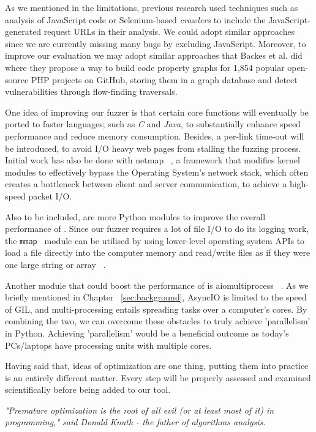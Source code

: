 As we mentioned in the limitations, previous research used techniques such as analysis of JavaScript code or Selenium-based \emph{crawlers} to include the JavaScript-generated request URLs in their analysis. We could adopt similar approaches since we are currently missing many bugs by excluding JavaScript. Moreover, to improve our evaluation we may adopt similar approaches that Backes et al. did  ~\cite{efficient2017} where they propose a way to build code property graphs for 1,854 popular open-source PHP projects on GitHub, storing them in a graph database and detect vulnerabilities through flow-finding traversals.

One idea of improving our fuzzer is that certain core functions will eventually be ported to faster languages; such as \emph{C} and \emph{Java}, to substantially enhance speed performance and reduce memory consumption. Besides, a per-link time-out will be introduced, to avoid I/O heavy web pages from stalling the fuzzing process. Initial work has also be done with netmap  ~\cite{rizzo2011Netmap}, a framework that modifies kernel modules to effectively bypass the Operating System's network stack, which often creates a bottleneck between client and server communication, to achieve a high-speed packet I/O.

Also to be included, are more Python modules to improve the overall performance of \pname{}. Since our fuzzer requires a lot of file I/O to do its logging work, the {\tt mmap } module can be utilised by using lower-level operating system APIs to load a file directly into the computer memory and read/write files as if they were one large string or array ~\cite{mmap}. 

Another module that could boost the performance of \pname{} is aiomultiprocess ~\cite{aiomultiprocess}. As we briefly mentioned in Chapter ~\ref{sec:background}, AsyncIO is limited to the speed of GIL, and multi-processing entails spreading tasks over a computer's cores. By combining the two, we can overcome these obstacles to truly achieve 'parallelism' in Python. Achieving 'parallelism' would be a beneficial outcome as today's PCs/laptops have processing units with multiple cores.

Having said that, ideas of optimization are one thing, putting them into practice is an entirely different matter. Every step will be properly assessed and examined scientifically before being added to our tool.

\textit{"Premature optimization is the root of all evil (or at least most of it) in programming," said Donald Knuth - the father of algorithms analysis.}
